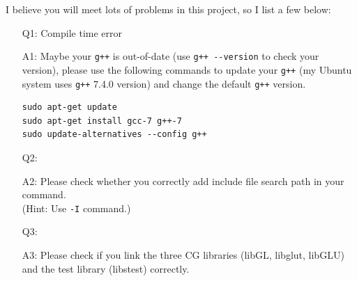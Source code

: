 \documentclass[english]{../TexTemplate/thesis}
\begin{document}
I believe you will meet lots of problems in this project, so I list a few below:
\begin{enumerate}
	\item [Q1:] Compile time error
	\item [A1:] Maybe your \verb'g++' is out-of-date (use \verb'g++ --version' to check your version), please use the following commands to update your \verb'g++' (my Ubuntu system uses \verb'g++' 7.4.0 version) and change the default \verb'g++' version.
\begin{lstlisting}
sudo apt-get update
sudo apt-get install gcc-7 g++-7
sudo update-alternatives --config g++
\end{lstlisting}

	\item [Q2:] 
	\item [A2:] Please check whether you correctly add include file search path in your command.\\
	(Hint: Use \verb'-I' command.)

	\item [Q3:]
	\item [A3:] Please check if you link the three CG libraries (libGL, libglut, libGLU) and the test library (libstest) correctly.


\end{enumerate}
\end{document}
